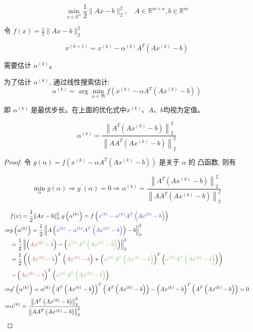 \begin{problem}
    $$
    \min _{x \in \mathbb{R}^{n}} \frac{1}{2}\|A x-b\|_{2}^{2}, \quad A \in \mathbb{R}^{m \times n}, b \in \mathbb{R}^{m}
    $$
    
    令 $ f(x)=\frac{1}{2}\|A x-b\|_{2}^{2} $

    $$ x^{(k+1)}=x^{(k)}-\alpha^{(k)} A^{T}\left(A x^{(k)}-b\right) $$

    需要估计 $ \alpha^{(k)} $。
\end{problem}

为了估计 $ \alpha^{(k)} $, 通过线性搜索估计:
$$
\alpha^{(k)}=\arg \min _{\alpha \in \Re} f\left(x^{(k)}-\alpha A^{T}\left(A x^{(k)}-b\right)\right)
$$

即 $ \alpha^{(k)} $ 是最优步长。在上面的优化式中$x^{(k)}$、$A$、$b$均视为定值。

\begin{theorem}[线性搜索估计的最优步长]
    $$\alpha^{(k)}=\frac{\left\|A^{T}\left(A x^{(k)}-b\right)\right\|_{2}^{2}}{\left\|A A^{T}\left(A x^{(k)}-b\right)\right\|_{2}^{2}}$$
\end{theorem}

\begin{proof}
    令 $ g(\alpha)=f\left(x^{(k)}-\alpha A^{T}\left(A x^{(k)}-b\right)\right) $ 是关于 $ \alpha $ 的 凸函数, 则有

$$
\min _{\alpha} g(\alpha) \Rightarrow g^{\prime}(\alpha)=0 \Rightarrow \alpha^{(k)}=\frac{\left\|A^{T}\left(A x^{(k)}-b\right)\right\|_{2}^{2}}{\left\|A A^{T}\left(A x^{(k)}-b\right)\right\|_{2}^{2}}
$$


$$\begin{aligned}
    & f(x)=\frac{1}{2}\|A x-b\|_{2}^{2}, g\left(\alpha^{(k)}\right)=f\left({\color{violet} x^{(k)}-\alpha^{(k)} A^{T}\left(A x^{(k)}-b\right)} \right) \\
    \Rightarrow & g\left(\alpha^{(k)}\right)=\frac{1}{2}\left\|A\left({\color{violet} x^{(k)}-\alpha^{(k)} A^{T}\left(A x^{(k)}-b\right)} \right)-b\right\|_{2}^{2} \\
    &=\frac{1}{2}\left\|\left({\color{coral} A x^{(k)}-b} \right)-\left({\color{grass} \alpha^{(k)} A^{T}\left(A x^{(k)}-b\right)} \right)\right\|_{2}^{2} \\
    &=\frac{1}{2}\left(\left({\color{coral} A x^{(k)}-b} \right)^{T}\left({\color{coral} A x^{(k)}-b} \right)+\left({\color{grass} \alpha^{(k)} A^{T}\left(A x^{(k)}-b\right)} \right)^{T}\left({\color{grass} \alpha^{(k)} A^{T}\left(A x^{(k)}-b\right)} \right)\right) \\
    &-\left({\color{coral} A x^{(k)}-b} \right)^{T}\left({\color{grass} \alpha^{(k)} A^{T}\left(A x^{(k)}-b\right)} \right) \\
    \Rightarrow & g^{\prime}\left(\alpha^{(k)}\right)=\alpha^{(k)}\left(A^{T}\left(A x^{(k)}-b\right)\right)^{T}\left(A^{T}\left(A x^{(k)}-b\right)\right)-\left(A x^{(k)}-b\right)^{T}\left(A^{T}\left(A x^{(k)}-b\right)\right)=0 \\
    \Rightarrow &\alpha^{(k)}=\frac{\left\|A^{T}\left(A x^{(k)}-b\right)\right\|_{2}^{2}}{\left\|A A^{T}\left(A x^{(k)}-b\right)\right\|_{2}^{2}}
    \end{aligned}$$

\end{proof}


